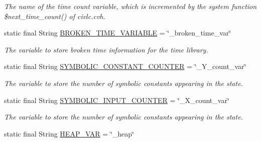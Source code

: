 \begin{DoxyCompactItemize}
\begin{DoxyCompactList}\small\item\em The name of the time count variable, which is incremented by the system function \$next\+\_\+time\+\_\+count() of civlc.\+cvh. \end{DoxyCompactList}\item 
static final String \hyperlink{classedu_1_1udel_1_1cis_1_1vsl_1_1civl_1_1model_1_1IF_1_1ModelConfiguration_abee0bec5f2dd8436a04329f8faa22a27}{B\+R\+O\+K\+E\+N\+\_\+\+T\+I\+M\+E\+\_\+\+V\+A\+R\+I\+A\+B\+L\+E} = \char`\"{}\+\_\+broken\+\_\+time\+\_\+var\char`\"{}
\begin{DoxyCompactList}\small\item\em The variable to store broken time information for the time library. \end{DoxyCompactList}\item 
\hypertarget{classedu_1_1udel_1_1cis_1_1vsl_1_1civl_1_1model_1_1IF_1_1ModelConfiguration_afd4c923c477d3e3844385b5c18c3aa98}{}static final String \hyperlink{classedu_1_1udel_1_1cis_1_1vsl_1_1civl_1_1model_1_1IF_1_1ModelConfiguration_afd4c923c477d3e3844385b5c18c3aa98}{S\+Y\+M\+B\+O\+L\+I\+C\+\_\+\+C\+O\+N\+S\+T\+A\+N\+T\+\_\+\+C\+O\+U\+N\+T\+E\+R} = \char`\"{}\+\_\+\+Y\+\_\+count\+\_\+var\char`\"{}\label{classedu_1_1udel_1_1cis_1_1vsl_1_1civl_1_1model_1_1IF_1_1ModelConfiguration_afd4c923c477d3e3844385b5c18c3aa98}

\begin{DoxyCompactList}\small\item\em The variable to store the number of symbolic constants appearing in the state. \end{DoxyCompactList}\item 
\hypertarget{classedu_1_1udel_1_1cis_1_1vsl_1_1civl_1_1model_1_1IF_1_1ModelConfiguration_a4ade21cb8499365d0ba92cfa16e78da6}{}static final String \hyperlink{classedu_1_1udel_1_1cis_1_1vsl_1_1civl_1_1model_1_1IF_1_1ModelConfiguration_a4ade21cb8499365d0ba92cfa16e78da6}{S\+Y\+M\+B\+O\+L\+I\+C\+\_\+\+I\+N\+P\+U\+T\+\_\+\+C\+O\+U\+N\+T\+E\+R} = \char`\"{}\+\_\+\+X\+\_\+count\+\_\+var\char`\"{}\label{classedu_1_1udel_1_1cis_1_1vsl_1_1civl_1_1model_1_1IF_1_1ModelConfiguration_a4ade21cb8499365d0ba92cfa16e78da6}

\begin{DoxyCompactList}\small\item\em The variable to store the number of symbolic constants appearing in the state. \end{DoxyCompactList}\item 
\hypertarget{classedu_1_1udel_1_1cis_1_1vsl_1_1civl_1_1model_1_1IF_1_1ModelConfiguration_a628eb377688befd5ad61197d3e5b057b}{}static final String \hyperlink{classedu_1_1udel_1_1cis_1_1vsl_1_1civl_1_1model_1_1IF_1_1ModelConfiguration_a628eb377688befd5ad61197d3e5b057b}{H\+E\+A\+P\+\_\+\+V\+A\+R} = \char`\"{}\+\_\+heap\char`\"{}\label{classedu_1_1udel_1_1cis_1_1vsl_1_1civl_1_1model_1_1IF_1_1ModelConfiguration_a628eb377688befd5ad61197d3e5b057b}


\end{DoxyCompactItemize}

